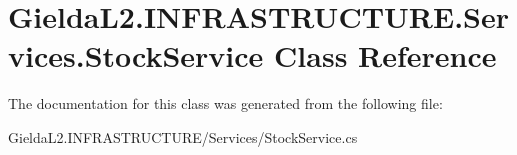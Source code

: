 \hypertarget{class_gielda_l2_1_1_i_n_f_r_a_s_t_r_u_c_t_u_r_e_1_1_services_1_1_stock_service}{}\section{Gielda\+L2.\+I\+N\+F\+R\+A\+S\+T\+R\+U\+C\+T\+U\+R\+E.\+Services.\+Stock\+Service Class Reference}
\label{class_gielda_l2_1_1_i_n_f_r_a_s_t_r_u_c_t_u_r_e_1_1_services_1_1_stock_service}


The documentation for this class was generated from the following file\+:\begin{DoxyCompactItemize}
\item 
Gielda\+L2.\+I\+N\+F\+R\+A\+S\+T\+R\+U\+C\+T\+U\+R\+E/\+Services/Stock\+Service.\+cs\end{DoxyCompactItemize}

